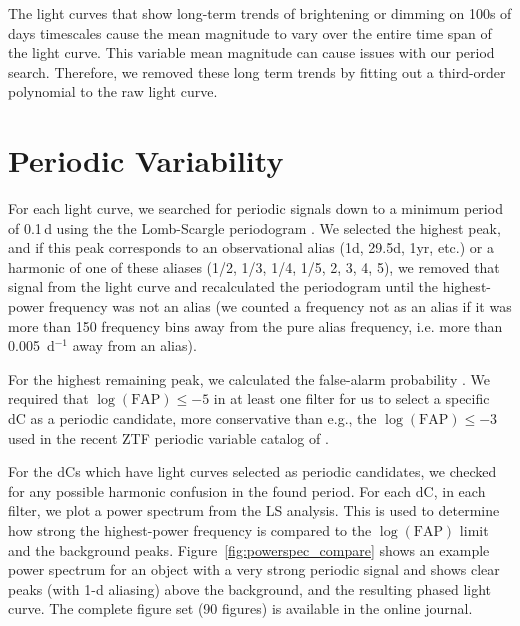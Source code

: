 \documentclass[twocolumn]{aastex631}
\begin{document}
The light curves that show long-term trends of brightening or dimming on 100s of days timescales cause the mean magnitude to vary over the entire time span of the light curve. This variable mean magnitude can cause issues with our period search. Therefore, we removed these long term trends by fitting out a third-order polynomial to the raw light curve. 


\section{Periodic Variability}\label{sec:periodic}

For each light curve, we searched for periodic signals down to a minimum period of 0.1\,d using the the Lomb-Scargle periodogram \citep[LS;][]{Lomb1976, Scargle1982}.  We selected the highest peak, and if this peak corresponds to an observational alias (1d, 29.5d, 1yr, etc.) or a harmonic of one of these aliases (1/2, 1/3, 1/4, 1/5, 2, 3, 4, 5), we removed that signal from the light curve and recalculated the periodogram until the highest-power frequency was not an alias (we counted a frequency not as an alias if it was more than 150 frequency bins away from the pure alias frequency, i.e. more than 0.005~d$^{-1}$ away from an alias).

For the highest remaining peak, we calculated the false-alarm probability \citep{Vanderplas2018}. We required that $\log{\left( \textrm{FAP} \right)} \leq -5$ in at least one filter for us to select a specific dC as a periodic candidate, more conservative than e.g., the $\log{\left( \textrm{FAP} \right)} \leq -3$ used in the recent ZTF periodic variable catalog of \citet{ChenX2020}.

For the dCs which have light curves selected as periodic candidates, we checked for any possible harmonic confusion in the found period. For each dC, in each filter, we plot a power spectrum from the LS analysis. This is used to determine how strong the highest-power frequency is compared to the $\log{\left( \textrm{FAP} \right)}$ limit and the background peaks. Figure~\ref{fig:powerspec_compare} shows an example power spectrum for an object with a very strong periodic signal and shows clear peaks (with 1-d aliasing) above the background, and the resulting phased light curve. The complete figure set (90 figures) is available in the online journal.
\end{document}
